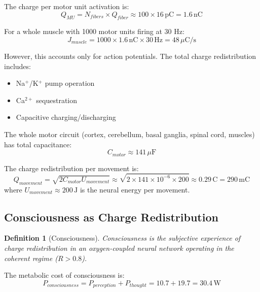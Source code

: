 \documentclass[12pt,a4paper]{article}
\newtheorem{definition}[theorem]{Definition}
\begin{document}
The charge per motor unit activation is:
\begin{equation}
Q_{MU} = N_{fibers} \times Q_{fiber} \approx 100 \times 16 \, \text{pC} = 1.6 \, \text{nC}
\end{equation}

For a whole muscle with 1000 motor units firing at 30 Hz:
\begin{equation}
J_{muscle} = 1000 \times 1.6 \, \text{nC} \times 30 \, \text{Hz} = 48 \, \mu\text{C/s}
\end{equation}

However, this accounts only for action potentials. The total charge redistribution includes:
\begin{itemize}
\item Na$^+$/K$^+$ pump operation
\item Ca$^{2+}$ sequestration
\item Capacitive charging/discharging
\end{itemize}

The whole motor circuit (cortex, cerebellum, basal ganglia, spinal cord, muscles) has total capacitance:
\begin{equation}
C_{motor} \approx 141 \, \mu\text{F}
\end{equation}

The charge redistribution per movement is:
\begin{equation}
Q_{movement} = \sqrt{2 C_{motor} U_{movement}} \approx \sqrt{2 \times 141 \times 10^{-6} \times 200} \approx 0.29 \, \text{C} = 290 \, \text{mC}
\end{equation}
where $U_{movement} \approx 200 \, \text{J}$ is the neural energy per movement.

\subsection{Consciousness as Charge Redistribution}

\begin{definition}[Consciousness]
Consciousness is the subjective experience of charge redistribution in an oxygen-coupled neural network operating in the coherent regime ($R > 0.8$).
\end{definition}

The metabolic cost of consciousness is:
\begin{equation}
P_{consciousness} = P_{perception} + P_{thought} = 10.7 + 19.7 = 30.4 \, \text{W}
\end{equation}
\end{document}
